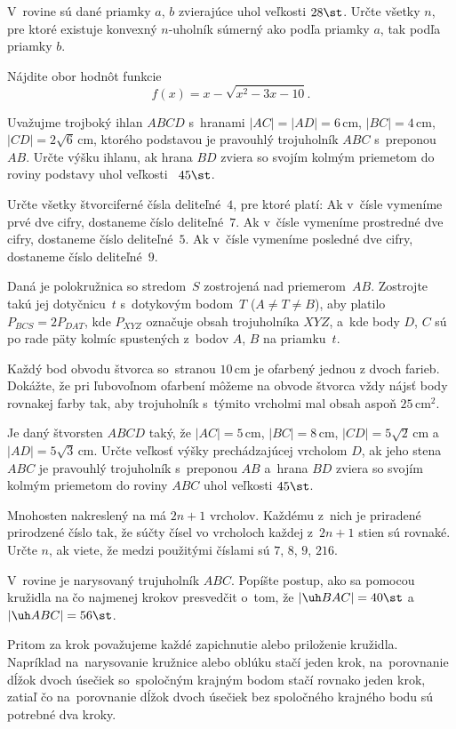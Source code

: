 {%
V~rovine sú dané priamky $a$, $b$ zvierajúce uhol veľkosti
$28\st$.  Určte všetky $n$, pre ktoré existuje konvexný
$n$-uholník súmerný  ako podľa priamky $a$, tak podľa priamky $b$.
}

{%
Nájdite obor hodnôt funkcie
$$
f(x)=x-\sqrt{x^2-3x-10}.
$$
}

{%
Uvažujme trojboký ihlan $ABCD$ s~hranami  $|AC| = |AD| =6$\,cm,
$|BC| =4 $\,cm,  $|CD| =2\sqrt 6 $\,cm, ktorého podstavou
je pravouhlý trojuholník $ABC$ s~preponou $AB$.  Určte výšku
ihlanu, ak
hrana $BD$ zviera so svojím kolmým priemetom do roviny podstavy uhol
veľkosti~ $45\st$.
}

{%
Určte všetky štvorciferné čísla deliteľné~$4$, pre ktoré platí:
Ak v~čísle vymeníme prvé dve cifry, dostaneme číslo
deliteľné~$7$. Ak v~čísle vymeníme prostredné dve cifry,
dostaneme číslo deliteľné~$5$. Ak v~čísle vymeníme posledné
dve cifry, dostaneme číslo deliteľné~$9$.
}

{%
Daná je polokružnica so stredom~$S$ zostrojená nad priemerom~$AB$. Zostrojte takú jej dotyčnicu~$t$ s~dotykovým bodom~$T$
($A\ne T\ne B$), aby platilo $P_{BCS}=2P_{DAT}$, kde $P_{XYZ}$
označuje obsah trojuholníka $XYZ$, a~kde body $D$, $C$ sú po rade päty
kolmíc spustených z~bodov $A$, $B$ na priamku~$t$.
}

{%
Každý bod obvodu štvorca so~stranou $10$\,cm je ofarbený jednou z
dvoch farieb. Dokážte, že pri ľubovoľnom ofarbení môžeme na obvode
štvorca vždy nájsť body rovnakej farby tak, aby trojuholník s~týmito
vrcholmi mal obsah aspoň $25$\,cm$^2$.
}

{%
Je daný štvorsten $ABCD$ taký, že $|AC|=5$\,cm, $|BC|=8$\,cm,
$|CD|=5\sqrt2$\,cm a~$|AD|=5\sqrt3$\,cm. Určte veľkosť výšky
prechádzajúcej vrcholom $D$, ak jeho stena $ABC$ je pravouhlý
trojuholník s~preponou $AB$ a~hrana $BD$ zviera so svojím kolmým priemetom
do roviny $ABC$ uhol veľkosti $45\st$.
}

{%
Mnohosten nakreslený na \obr{} má $2n+1$ vrcholov. Každému z~nich
je priradené prirodzené číslo tak, že súčty čísel vo vrcholoch
každej z~$2n+1$ stien sú rovnaké. Určte $n$, ak viete, že medzi
použitými číslami sú $7$, $8$, $9$, $216$.
%
}

{%
V~rovine je narysovaný trujuholník $ABC$. Popíšte postup, ako sa pomocou
kružidla na čo najmenej krokov presvedčit o~tom,
že $|\uh BAC|=40\st$ a~$|\uh ABC|=56\st$.

Pritom za krok považujeme každé zapichnutie alebo priloženie
kružidla. Napríklad na~narysovanie kružnice alebo oblúku stačí
jeden krok, na~porovnanie dĺžok dvoch úsečiek so~spoločným krajným
bodom stačí rovnako jeden krok, zatiaľ čo na~porovnanie dĺžok dvoch
úsečiek bez spoločného krajného bodu sú potrebné dva kroky.
}

